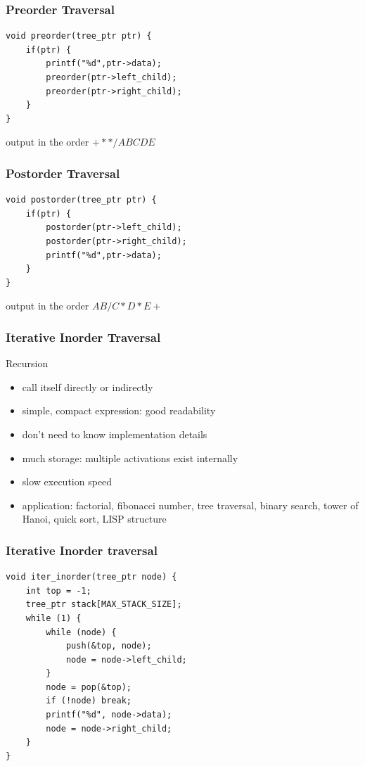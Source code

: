 \documentclass[newPxFont,sthlmFooter,nooffset]{beamer}
\begin{document}
\begin{frame}[t, fragile]
  \frametitle{Preorder Traversal}

\begin{lstlisting}
void preorder(tree_ptr ptr) { 
    if(ptr) {
        printf("%d",ptr->data); 
        preorder(ptr->left_child); 
        preorder(ptr->right_child);
    } 
}  
\end{lstlisting}

output in the order $+**/ABCDE$

\end{frame}


\begin{frame}[t, fragile]
  \frametitle{Postorder Traversal}
\begin{lstlisting}
void postorder(tree_ptr ptr) { 
    if(ptr) {
        postorder(ptr->left_child); 
        postorder(ptr->right_child);
        printf("%d",ptr->data); 
    } 
}  
\end{lstlisting}

output in the order $AB/C*D*E+$

\end{frame}


\begin{frame}[t]
  \frametitle{Iterative Inorder Traversal}
Recursion
\begin{itemize}
\item call itself directly or indirectly
\item simple, compact expression: good
readability
\item don’t need to know implementation
details
\item much storage: multiple activations
exist internally
\item  slow execution speed
\item  application: factorial, fibonacci
number, tree traversal, binary search, tower of Hanoi, quick sort, LISP structure
\end{itemize}
\end{frame}


\begin{frame}[t, fragile]
  \frametitle{Iterative Inorder traversal}
  \begin{lstlisting}
void iter_inorder(tree_ptr node) { 
    int top = -1;
    tree_ptr stack[MAX_STACK_SIZE]; 
    while (1) {
        while (node) {
            push(&top, node);
            node = node->left_child;
        }
        node = pop(&top);
        if (!node) break; 
        printf("%d", node->data); 
        node = node->right_child;
    } 
}    
  \end{lstlisting}
\end{frame}
\end{document}

